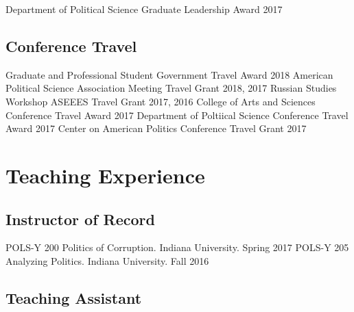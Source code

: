 \documentclass[11pt,]{article}
\begin{document}
\vspace{-2mm}

Department of Political Science Graduate Leadership Award \hfill 2017
\break

\vspace{-7mm}

\hypertarget{conference-travel}{%
\subsection{Conference Travel}\label{conference-travel}}

\vspace{-2mm}

Graduate and Professional Student Government Travel Award \hfill 2018
\break American Political Science Association Meeting Travel Grant
\hfill 2018, 2017 \break Russian Studies Workshop ASEEES Travel Grant
\hfill 2017, 2016 \break College of Arts and Sciences Conference Travel
Award \hfill 2017 \break Department of Poltiical Science Conference
Travel Award \hfill 2017 \break Center on American Politics Conference
Travel Grant \hfill 2017 \break

\vspace{-5mm}

\hypertarget{teaching-experience}{%
\section{Teaching Experience}\label{teaching-experience}}

\vspace{-2mm}

\hypertarget{instructor-of-record}{%
\subsection{Instructor of Record}\label{instructor-of-record}}

\vspace{-2mm}

POLS-Y 200 Politics of Corruption. Indiana University. \hfill Spring
2017 \break POLS-Y 205 Analyzing Politics. Indiana University.
\hfill Fall 2016 \break

\vspace{-7mm}

\hypertarget{teaching-assistant}{%
\subsection{Teaching Assistant}\label{teaching-assistant}}
\end{document}
